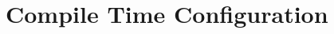\hypertarget{group__switch-config}{\section{Compile Time Configuration}
\label{group__switch-config}
}
